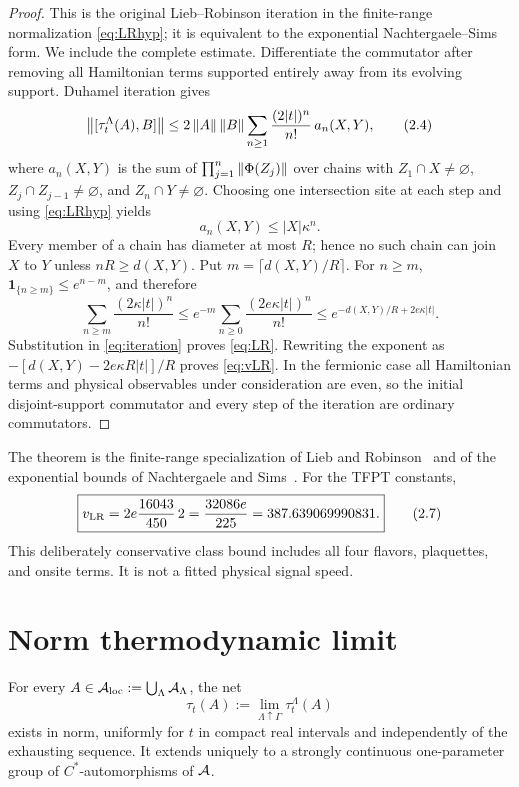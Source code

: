 \begin{proof}
This is the original Lieb--Robinson iteration in the finite-range
normalization \eqref{eq:LRhyp}; it is equivalent to the exponential
Nachtergaele--Sims form.  We include the complete estimate.
Differentiate the commutator after removing all Hamiltonian terms supported
entirely away from its evolving support.  Duhamel iteration gives
\[
 \left\lVert[\tau_t^\Lambda(A),B]\right\rVert
 \leq2\left\lVert A\right\rVert\left\lVert B\right\rVert
 \sum_{n\geq1}\frac{(2|t|)^n}{n!}\,a_n(X,Y),
\tag{2.4}\label{eq:iteration}
\]
where \(a_n(X,Y)\) is the sum of
\(\prod_{j=1}^n\left\lVert\Phi(Z_j)\right\rVert\) over chains with
\(Z_1\cap X\ne\varnothing\), \(Z_j\cap Z_{j-1}\ne\varnothing\), and
\(Z_n\cap Y\ne\varnothing\).  Choosing one intersection site at each
step and using \eqref{eq:LRhyp} yields
\[
 a_n(X,Y)\leq |X|\kappa^n.
\tag{2.5}\label{eq:pathweight}
\]
Every member of a chain has diameter at most \(R\); hence no such chain can
join \(X\) to \(Y\) unless \(nR\geq d(X,Y)\).  Put
\(m=\lceil d(X,Y)/R\rceil\).  For \(n\geq m\),
\(\mathbf1_{\{n\geq m\}}\leq e^{n-m}\), and therefore
\[
 \sum_{n\geq m}\frac{(2\kappa|t|)^n}{n!}
 \leq e^{-m}\sum_{n\geq0}\frac{(2e\kappa|t|)^n}{n!}
 \leq
 e^{-d(X,Y)/R+2e\kappa|t|}.
\tag{2.6}\label{eq:poissontail}
\]
Substitution in \eqref{eq:iteration} proves \eqref{eq:LR}.  Rewriting
the exponent as
\(-[d(X,Y)-2e\kappa R|t|]/R\) proves \eqref{eq:vLR}.  In the fermionic
case all Hamiltonian terms and physical observables under consideration
are even, so the initial disjoint-support commutator and every step of the
iteration are ordinary commutators.
\end{proof}

The theorem is the finite-range specialization of Lieb and
Robinson~\cite{LR1972} and of the exponential bounds of
Nachtergaele and Sims~\cite{NS2006,NS2010}.  For the TFPT constants,
\[
 \boxed{
 v_{\rm LR}=2e\frac{16043}{450}\,2
 =\frac{32086e}{225}
 =387.639069990831.}
\tag{2.7}\label{eq:TFPTvelocity}
\]
This deliberately conservative class bound includes all four flavors,
plaquettes, and onsite terms.  It is not a fitted physical signal speed.

\section{Norm thermodynamic limit}

\begin{theorem}
\label{thm:dynamics}
For every \(A\in\mathcal A_{\rm loc}:=\bigcup_{\Lambda}\mathcal A_\Lambda\), the net
\[
 \tau_t(A):=\lim_{\Lambda\uparrow\Gamma}\tau_t^\Lambda(A)
\tag{3.1}\label{eq:limit}
\]
exists in norm, uniformly for \(t\) in compact real intervals and
independently of the exhausting sequence.  It extends uniquely to a
strongly continuous one-parameter group of \(C^*\)-automorphisms of
\(\mathcal A\).
\end{theorem}

